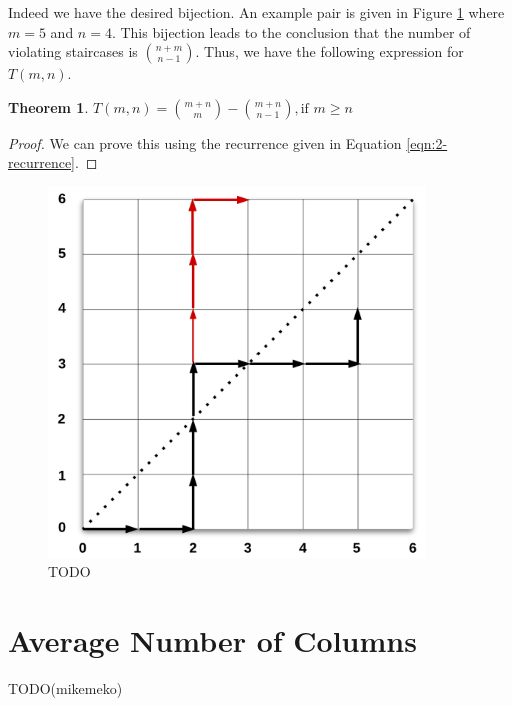 \documentclass[12pt]{amsart}
\newtheorem{theorem}{Theorem}[section]
\begin{document}
Indeed we have the desired bijection. An example pair is given in Figure \ref{fig:reflection} where $m=5$ and $n=4$. This bijection leads to the conclusion that the number of violating staircases is $\binom{n+m}{n-1}$. Thus, we have the following expression for $T(m,n)$.

\begin{theorem}
$T(m,n) = \binom{m+n}{m} - \binom{m+n}{n-1}, \text{if $m \geq n$}$
\end{theorem}

\begin{proof}
We can prove this using the recurrence given in Equation \ref{eqn:2-recurrence}.
\end{proof}

\begin{figure}
\includegraphics[width=10cm]{reflection.png}
\caption{TODO}
\label{fig:reflection}
\end{figure}

\section{Average Number of Columns\label{sec:columns}}
TODO(mikemeko)
\end{document}
